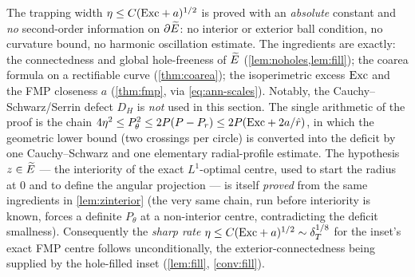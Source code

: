 \begin{remark}\label{rem:summary}
The trapping width $\eta\le C(\mathrm{Exc}+a)^{1/2}$ is proved with an
\emph{absolute} constant and \emph{no} second-order information on
$\partial\widetilde{E}$: no interior or exterior ball condition, no curvature bound,
no harmonic oscillation estimate. The ingredients are exactly: the
connectedness and global hole-freeness of $\widetilde{E}$
(\cref{lem:noholes,lem:fill}); the
coarea formula on a rectifiable curve (\cref{thm:coarea}); the isoperimetric
excess $\mathrm{Exc}$ and the FMP closeness $a$ (\cref{thm:fmp}, via
\eqref{eq:ann-scales}). Notably, the Cauchy--Schwarz/Serrin defect $D_H$ is
\emph{not} used in this section. The single arithmetic of the proof is the
chain $4\eta^2\le P_\theta^2\le2P(P-P_r)\le2P(\mathrm{Exc}+2a/\hat r)$, in which the
geometric lower bound (two crossings per circle) is converted into the
deficit by one Cauchy--Schwarz and one elementary radial-profile estimate.
The hypothesis $z\in\widetilde{E}$ --- the interiority of the exact $L^1$-optimal
centre, used to start the radius at $0$ and to define the angular projection
--- is itself \emph{proved} from the same ingredients in \cref{lem:zinterior}
(the very same chain, run before interiority is known, forces a definite
$P_\theta$ at a non-interior centre, contradicting the deficit smallness).
Consequently the \emph{sharp rate} $\eta\le C(\mathrm{Exc}+a)^{1/2}\sim\delta_T^{1/8}$ for
the inset's exact FMP centre follows unconditionally, the
exterior-connectedness being supplied by the hole-filled inset
(\cref{lem:fill}, \cref{conv:fill}).
\end{remark}
